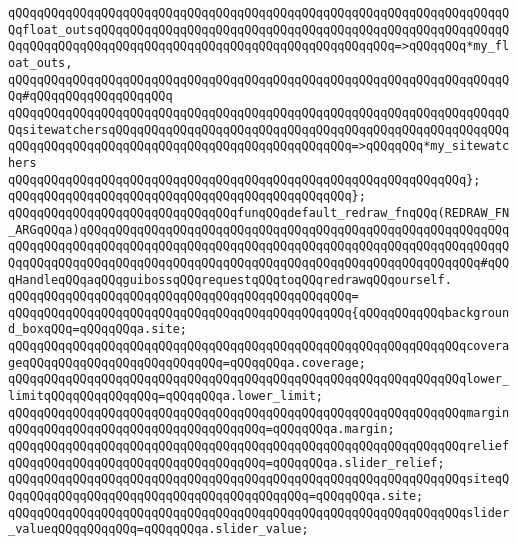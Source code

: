 \verb|qQQqqQQqqQQqqQQqqQQqqQQqqQQqqQQqqQQqqQQqqQQqqQQqqQQqqQQqqQQqqQQqqQQqqQQqfloat_outsqQQqqQQqqQQqqQQqqQQqqQQqqQQqqQQqqQQqqQQqqQQqqQQqqQQqqQQqqQQqqQQqqQQqqQQqqQQqqQQqqQQqqQQqqQQqqQQqqQQqqQQqqQQqqQQq=>qQQqqQQq*my_float_outs,|\newline
\verb|qQQqqQQqqQQqqQQqqQQqqQQqqQQqqQQqqQQqqQQqqQQqqQQqqQQqqQQqqQQqqQQqqQQqqQQq#qQQqqQQqqQQqqQQqqQQq|\newline
\verb|qQQqqQQqqQQqqQQqqQQqqQQqqQQqqQQqqQQqqQQqqQQqqQQqqQQqqQQqqQQqqQQqqQQqqQQqsitewatchersqQQqqQQqqQQqqQQqqQQqqQQqqQQqqQQqqQQqqQQqqQQqqQQqqQQqqQQqqQQqqQQqqQQqqQQqqQQqqQQqqQQqqQQqqQQqqQQqqQQqqQQq=>qQQqqQQq*my_sitewatchers|\newline
\verb|qQQqqQQqqQQqqQQqqQQqqQQqqQQqqQQqqQQqqQQqqQQqqQQqqQQqqQQqqQQqqQQq};|\newline
\verb|qQQqqQQqqQQqqQQqqQQqqQQqqQQqqQQqqQQqqQQqqQQqqQQq};|\newline
\newline
\newline
\verb|qQQqqQQqqQQqqQQqqQQqqQQqqQQqqQQqfunqQQqdefault_redraw_fnqQQq(REDRAW_FN_ARGqQQqa)qQQqqQQqqQQqqQQqqQQqqQQqqQQqqQQqqQQqqQQqqQQqqQQqqQQqqQQqqQQqqQQqqQQqqQQqqQQqqQQqqQQqqQQqqQQqqQQqqQQqqQQqqQQqqQQqqQQqqQQqqQQqqQQqqQQqqQQqqQQqqQQqqQQqqQQqqQQqqQQqqQQqqQQqqQQqqQQqqQQqqQQqqQQqqQQqqQQq#qQQqHandleqQQqaqQQqguibossqQQqrequestqQQqtoqQQqredrawqQQqourself.|\newline
\verb|qQQqqQQqqQQqqQQqqQQqqQQqqQQqqQQqqQQqqQQqqQQqqQQq=|\newline
\verb|qQQqqQQqqQQqqQQqqQQqqQQqqQQqqQQqqQQqqQQqqQQqqQQq{qQQqqQQqqQQqbackground_boxqQQq=qQQqqQQqa.site;|\newline
\verb|qQQqqQQqqQQqqQQqqQQqqQQqqQQqqQQqqQQqqQQqqQQqqQQqqQQqqQQqqQQqqQQqcoverageqQQqqQQqqQQqqQQqqQQqqQQqqQQq=qQQqqQQqa.coverage;|\newline
\verb|qQQqqQQqqQQqqQQqqQQqqQQqqQQqqQQqqQQqqQQqqQQqqQQqqQQqqQQqqQQqqQQqlower_limitqQQqqQQqqQQqqQQq=qQQqqQQqa.lower_limit;|\newline
\verb|qQQqqQQqqQQqqQQqqQQqqQQqqQQqqQQqqQQqqQQqqQQqqQQqqQQqqQQqqQQqqQQqmarginqQQqqQQqqQQqqQQqqQQqqQQqqQQqqQQqqQQq=qQQqqQQqa.margin;|\newline
\verb|qQQqqQQqqQQqqQQqqQQqqQQqqQQqqQQqqQQqqQQqqQQqqQQqqQQqqQQqqQQqqQQqreliefqQQqqQQqqQQqqQQqqQQqqQQqqQQqqQQqqQQq=qQQqqQQqa.slider_relief;|\newline
\verb|qQQqqQQqqQQqqQQqqQQqqQQqqQQqqQQqqQQqqQQqqQQqqQQqqQQqqQQqqQQqqQQqsiteqQQqqQQqqQQqqQQqqQQqqQQqqQQqqQQqqQQqqQQqqQQq=qQQqqQQqa.site;|\newline
\verb|qQQqqQQqqQQqqQQqqQQqqQQqqQQqqQQqqQQqqQQqqQQqqQQqqQQqqQQqqQQqqQQqslider_valueqQQqqQQqqQQq=qQQqqQQqa.slider_value;|\newline
